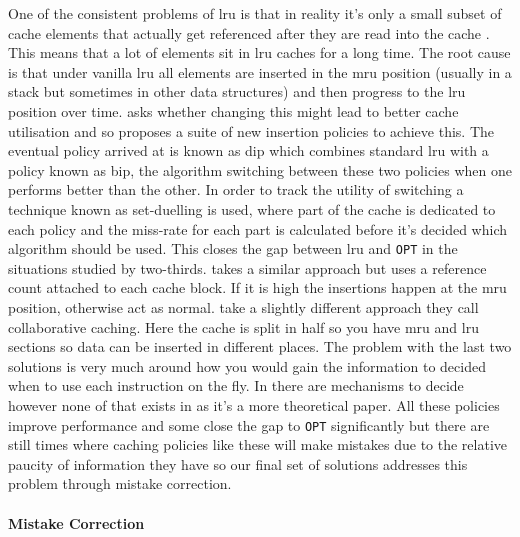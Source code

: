 One of the consistent problems of \gls{lru} is that in reality it's only a small subset of cache elements that actually get referenced after they are read into the cache \cite{qureshiAdaptiveInsertionPolicies2007}. This means that a lot of elements sit in \gls{lru} caches for a long time. The root cause is that under vanilla \gls{lru} all elements are inserted in the \gls{mru} position (usually in a stack but sometimes in other data structures) and then progress to the \gls{lru} position over time. \citeauthor{qureshiAdaptiveInsertionPolicies2007} \cite{qureshiAdaptiveInsertionPolicies2007, qureshiSetDuelingControlledAdaptiveInsertion2008} asks whether changing this might lead to better cache utilisation and so proposes a suite of new insertion policies to achieve this. The eventual policy arrived at is known as \gls{dip} which combines standard \gls{lru} with a policy known as \gls{bip}, the algorithm switching between these two policies when one performs better than the other. In order to track the utility of switching a technique known as set-duelling is used, where part of the cache is dedicated to each policy and the miss-rate for each part is calculated before it's decided which algorithm should be used. This closes the gap between \gls{lru} and \texttt{OPT} in the situations studied by two-thirds. \citet{sreedharanCacheReplacementPolicy2017} takes a similar approach but uses a reference count attached to each cache block. If it is high the insertions happen at the \gls{mru} position, otherwise act as normal. \citet{guTheoryPotentialLRUMRU2011} take a slightly different approach they call collaborative caching. Here the cache is split in half so you have \gls{mru} and \gls{lru} sections so data can be inserted in different places. The problem with the last two solutions is very much around how you would gain the information to decided when to use each instruction on the fly. In \citet{sreedharanCacheReplacementPolicy2017, qureshiAdaptiveInsertionPolicies2007} there are mechanisms to decide however none of that exists in \citet{guTheoryPotentialLRUMRU2011} as it's a more theoretical paper. All these policies improve performance and some close the gap to \texttt{OPT} significantly but there are still times where caching policies like these will make mistakes due to the relative paucity of information they have so our final set of solutions addresses this problem through mistake correction.

\paragraph{Mistake Correction}

